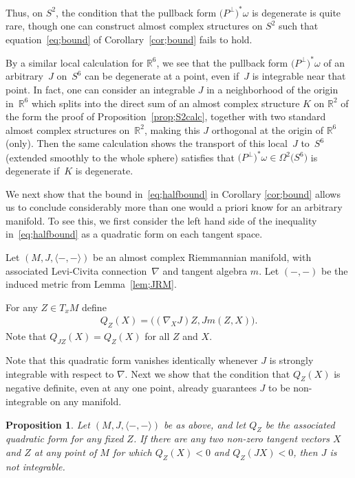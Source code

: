 \documentclass[10pt,a4paper]{amsart}
\newtheorem{prop}[thm]{Proposition}
{ \theoremstyle{definition} \newtheorem{defn}[thm]{Definition}
 \newtheorem{ex}[thm]{Example}
 \newtheorem{rmk}[thm]{Remark}}
\numberwithin{equation}{section}
\newcommand{\R}{\mathbb{R}}
\newcommand{\Om}{\Omega}
\begin{document}
Thus, on $S^2$, the condition that the pullback form $\big(P^\perp\big)^*\omega$ is degenerate is quite rare, though one can construct almost complex structures on $S^2$ such that equation~\eqref{eq;bound} of Corollary~\ref{cor;bound} fails to hold.

By a similar local calculation for $\R^6$, we see that the pullback form $\big(P^\perp\big)^*\omega$ of an arbitrary~$J$ on~$S^6$ can be degenerate at a point, even if~$J$ is integrable near that point. In fact, one can consider an integrable $J$ in a neighborhood of the origin in~$\R^6$ which splits into the direct sum of an almost complex structure $K$ on $\R^2$ of the form the proof of Proposition~\ref{prop;S2calc}, together with two standard almost complex structures on~$\R^2$, making this $J$ orthogonal at the origin of $\R^6$ (only). Then the same calculation shows the transport of this local~$J$ to~$S^6$ (extended smoothly to the whole sphere) satisfies that $\big(P^\perp\big)^*\omega \in \Om^2\big(S^6\big)$ is degenerate if~$K$ is degenerate.

We next show that the bound in~\eqref{eq;halfbound} in Corollary \ref{cor;bound} allows us to conclude considerably more than one would a priori know for an arbitrary manifold. To see this, we first consider the left hand side of the inequality in~\eqref{eq;halfbound} as a quadratic form on each tangent space.

\begin{defn}Let $(M,J, \langle - , - \rangle)$ be an almost complex Riemmannian manifold, with associated Levi-Civita connection~$\nabla$ and tangent algebra $m$. Let $( - , - )$ be the induced metric from Lemma~\ref{lem;JRM}.

For any $Z \in T_x M$ define
\begin{gather*}
Q_Z(X) = \big( (\nabla_X J) Z, J m(Z,X) \big) .
 \end{gather*}
 Note that $Q_{JZ}(X) = Q_Z(X) $ for all $Z$ and $X$.
 \end{defn}

Note that this quadratic form vanishes identically whenever $J$ is strongly integrable with respect to $\nabla$.
Next we show that the condition that $Q_Z(X)$ is negative definite, even at any one point, already guarantees $J$ to be non-integrable on any manifold.

 \begin{prop} Let $(M,J, \langle - , - \rangle)$ be as above, and let $Q_Z$ be the associated quadratic form
 for any fixed $Z$. If there are any two non-zero tangent vectors $X$ and $Z$ at any point of $M$ for which $Q_Z(X) < 0$ and $Q_Z(JX) < 0$, then $J$ is not integrable.
 \end{prop}
\end{document}
